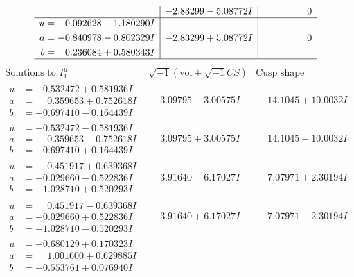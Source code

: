 \documentclass[1p]{elsarticle_modified}
\theoremstyle{definition}
\newcommand{\I}{\sqrt{-1}}
\begin{document}
$$\begin{array}{c|c|c}
 & -2.83299 - 5.08772 I & \phantom{-0.000000 } 0 \\ \hline\begin{aligned}
u &= -0.092628 - 1.180290 I \\
a &= -0.840978 - 0.802329 I \\
b &= \phantom{-}0.236084 + 0.580343 I\end{aligned}
 & -2.83299 + 5.08772 I & \phantom{-0.000000 } 0\\
 \hline 
 \end{array}$$\newpage$$\begin{array}{c|c|c}  
\text{Solutions to }I^u_{1}& \I (\text{vol} + \sqrt{-1}CS) & \text{Cusp shape}\\
 \hline 
\begin{aligned}
u &= -0.532472 + 0.581936 I \\
a &= \phantom{-}0.359653 + 0.752618 I \\
b &= -0.697410 - 0.164439 I\end{aligned}
 & \phantom{-}3.09795 - 3.00575 I & \phantom{-}14.1045 + 10.0032 I \\ \hline\begin{aligned}
u &= -0.532472 - 0.581936 I \\
a &= \phantom{-}0.359653 - 0.752618 I \\
b &= -0.697410 + 0.164439 I\end{aligned}
 & \phantom{-}3.09795 + 3.00575 I & \phantom{-}14.1045 - 10.0032 I \\ \hline\begin{aligned}
u &= \phantom{-}0.451917 + 0.639368 I \\
a &= -0.029660 - 0.522836 I \\
b &= -1.028710 + 0.520293 I\end{aligned}
 & \phantom{-}3.91640 - 6.17027 I & \phantom{-}7.07971 + 2.30194 I \\ \hline\begin{aligned}
u &= \phantom{-}0.451917 - 0.639368 I \\
a &= -0.029660 + 0.522836 I \\
b &= -1.028710 - 0.520293 I\end{aligned}
 & \phantom{-}3.91640 + 6.17027 I & \phantom{-}7.07971 - 2.30194 I \\ \hline\begin{aligned}
u &= -0.680129 + 0.170323 I \\
a &= \phantom{-}1.001600 + 0.629885 I \\
b &= -0.553761 + 0.076940 I\end{aligned}

\end{array}$$
\end{document}
